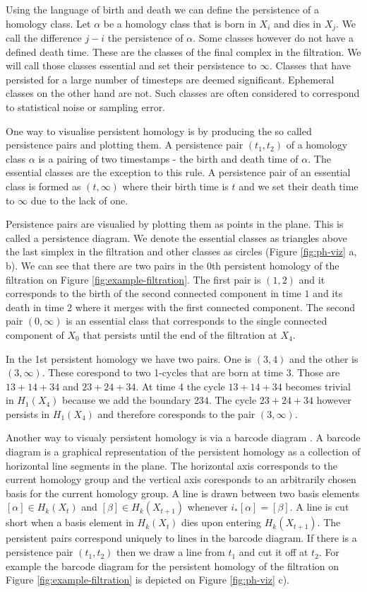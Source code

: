 Using the language of birth and death we can define the persistence of a homology class. Let $\alpha$ be a homology class that is born in $X_i$ and dies in $X_j$. We call the difference $j - i$ the persistence of $\alpha$. Some classes however do not have a defined death time. These are the classes of the final complex in the filtration. We will call those classes essential and set their persistence to $\infty$. Classes that have persisted for a large number of timesteps are deemed significant. Ephemeral classes on the other hand are not. Such classes are often considered to correspond to statistical noise or sampling error.

One way to visualise persistent homology is by producing the so called persistence pairs and plotting them. A persistence pair $(t_1, t_2)$ of a homology class $\alpha$ is a pairing of two timestamps - the birth and death time of $\alpha$. The essential classes are the exception to this rule. A persistence pair of an essential class is formed as $(t, \infty)$ where their birth time is $t$ and we set their death time to $\infty$ due to the lack of one.

Persistence pairs are visualied by plotting them as points in the plane. This is called a persistence diagram. We denote the essential classes as triangles above the last simplex in the filtration and other classes as circles (Figure \ref{fig:ph-viz} a, b). We can see that there are two pairs in the 0th persistent homology of the filtration on Figure \ref{fig:example-filtration}. The first pair is $(1, 2)$ and it corresponds to the birth of the second connected component in time $1$ and its death in time $2$ where it merges with the first connected component. The second pair $(0, \infty)$ is an essential class that corresponds to the single connected component of $X_0$ that persists until the end of the filtration at $X_4$.

In the 1st persistent homology we have two pairs. One is $(3, 4)$ and the other is $(3, \infty)$. These corespond to two 1-cycles that are born at time $3$. Those are $13 + 14 + 34$ and $23 + 24 + 34$. At time $4$ the cycle $13 + 14 + 34$ becomes trivial in $H_1(X_4)$ because we add the boundary $234$. The cycle $23 + 24 + 34$ however persists in $H_1(X_4)$ and therefore coresponds to the pair $(3, \infty)$.

Another way to visualy persistent homology is via a barcode diagram \cite{barcodes}. A barcode diagram is a graphical representation of the persistent homology as a collection of horizontal line segments in the plane. The horizontal axis corresponds to the current homology group and the vertical axis coresponds to an arbitrarily chosen basis for the current homology group. A line is drawn between two basis elements $[\alpha] \in H_k(X_t)$ and $[\beta] \in H_k(X_{t+1})$ whenever $i_*[\alpha] = [\beta]$. A line is cut short when a basis element in $H_k(X_t)$ dies upon entering $H_k(X_{t+1})$. The persistent pairs correspond uniquely to lines in the barcode diagram. If there is a persistence pair $(t_1, t_2)$ then we draw a line from $t_1$ and cut it off at $t_2$. For example the barcode diagram for the persistent homology of the filtration on Figure \ref{fig:example-filtration} is depicted on Figure \ref{fig:ph-viz} c).

